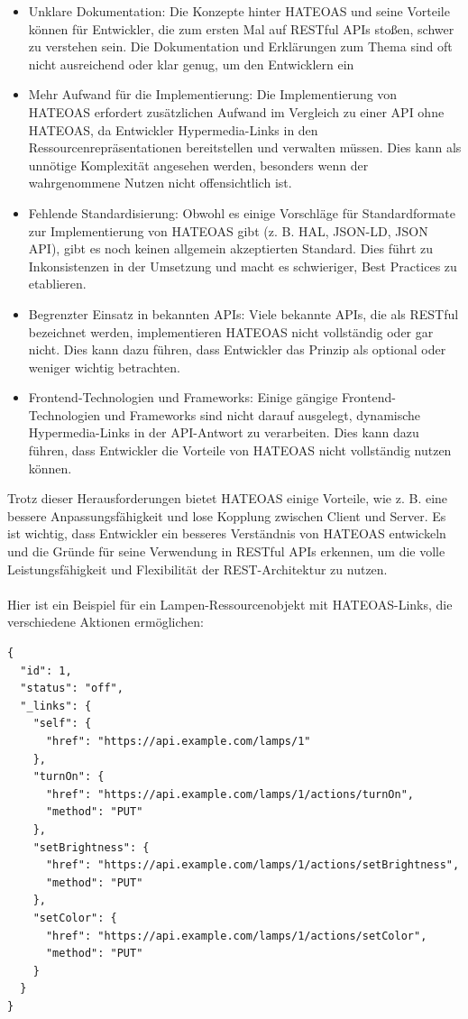 \begin{itemize}
\item Unklare Dokumentation: Die Konzepte hinter HATEOAS und seine Vorteile können für Entwickler, die zum ersten Mal auf RESTful APIs stoßen, schwer zu verstehen sein. Die Dokumentation und Erklärungen zum Thema sind oft nicht ausreichend oder klar genug, um den Entwicklern ein \item  Mehr Aufwand für die Implementierung: Die Implementierung von HATEOAS erfordert zusätzlichen Aufwand im Vergleich zu einer API ohne HATEOAS, da Entwickler Hypermedia-Links in den Ressourcenrepräsentationen bereitstellen und verwalten müssen. Dies kann als unnötige Komplexität angesehen werden, besonders wenn der wahrgenommene Nutzen nicht offensichtlich ist.
\item  Fehlende Standardisierung: Obwohl es einige Vorschläge für Standardformate zur Implementierung von HATEOAS gibt (z. B. HAL, JSON-LD, JSON API), gibt es noch keinen allgemein akzeptierten Standard. Dies führt zu Inkonsistenzen in der Umsetzung und macht es schwieriger, Best Practices zu etablieren.
\item  Begrenzter Einsatz in bekannten APIs: Viele bekannte APIs, die als RESTful bezeichnet werden, implementieren HATEOAS nicht vollständig oder gar nicht. Dies kann dazu führen, dass Entwickler das Prinzip als optional oder weniger wichtig betrachten.
\item  Frontend-Technologien und Frameworks: Einige gängige Frontend-Technologien und Frameworks sind nicht darauf ausgelegt, dynamische Hypermedia-Links in der API-Antwort zu verarbeiten. Dies kann dazu führen, dass Entwickler die Vorteile von HATEOAS nicht vollständig nutzen können.
\end{itemize}
Trotz dieser Herausforderungen bietet HATEOAS einige Vorteile, wie z. B. eine bessere Anpassungsfähigkeit und lose Kopplung zwischen Client und Server. Es ist wichtig, dass Entwickler ein besseres Verständnis von HATEOAS entwickeln und die Gründe für seine Verwendung in RESTful APIs erkennen, um die volle Leistungsfähigkeit und Flexibilität der REST-Architektur zu nutzen.
\\\\
Hier ist ein Beispiel für ein Lampen-Ressourcenobjekt mit HATEOAS-Links, die verschiedene Aktionen ermöglichen:\\
\noindent\begin{minipage}{\textwidth}
\begin{lstlisting}[caption={HATEOAS Lampe},captionpos=b,label={lst:hateoas}]
{
  "id": 1,
  "status": "off",
  "_links": {
    "self": {
      "href": "https://api.example.com/lamps/1"
    },
    "turnOn": {
      "href": "https://api.example.com/lamps/1/actions/turnOn",
      "method": "PUT"
    },
    "setBrightness": {
      "href": "https://api.example.com/lamps/1/actions/setBrightness",
      "method": "PUT"
    },
    "setColor": {
      "href": "https://api.example.com/lamps/1/actions/setColor",
      "method": "PUT"
    }
  }
}
\end{lstlisting}
\end{minipage}

